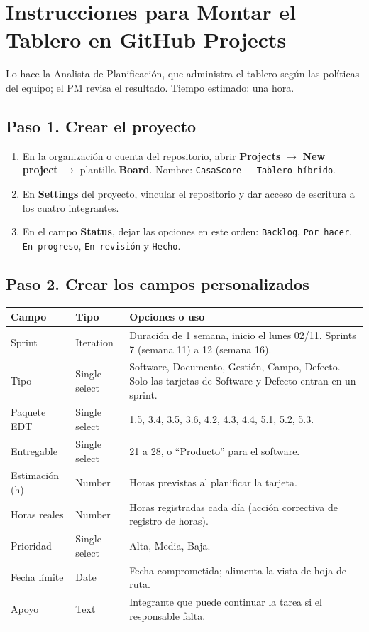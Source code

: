 \documentclass[11pt,a4paper]{article}
\begin{document}
\section{Instrucciones para Montar el Tablero en GitHub Projects}
Lo hace la Analista de Planificación, que administra el tablero según las políticas del equipo; el PM revisa el resultado. Tiempo estimado: una hora.

\subsection{Paso 1. Crear el proyecto}
\begin{enumerate}[leftmargin=*]
    \item En la organización o cuenta del repositorio, abrir \textbf{Projects} $\rightarrow$ \textbf{New project} $\rightarrow$ plantilla \textbf{Board}. Nombre: \texttt{CasaScore -- Tablero híbrido}.
    \item En \textbf{Settings} del proyecto, vincular el repositorio y dar acceso de escritura a los cuatro integrantes.
    \item En el campo \textbf{Status}, dejar las opciones en este orden: \texttt{Backlog}, \texttt{Por hacer}, \texttt{En progreso}, \texttt{En revisión} y \texttt{Hecho}.
\end{enumerate}

\subsection{Paso 2. Crear los campos personalizados}
{\small
{}
\noindent\begin{tabularx}{\textwidth}{@{}P{3.0cm} P{2.5cm} L@{}}
\toprule
{}
\textbf{Campo} & \textbf{Tipo} & \textbf{Opciones o uso} \\
\midrule
Sprint & Iteration & Duración de 1 semana, inicio el lunes 02/11. Sprints 7 (semana 11) a 12 (semana 16). \\
Tipo & Single select & Software, Documento, Gestión, Campo, Defecto. Solo las tarjetas de Software y Defecto entran en un sprint. \\
Paquete EDT & Single select & 1.5, 3.4, 3.5, 3.6, 4.2, 4.3, 4.4, 5.1, 5.2, 5.3. \\
Entregable & Single select & 21 a 28, o ``Producto'' para el software. \\
Estimación (h) & Number & Horas previstas al planificar la tarjeta. \\
Horas reales & Number & Horas registradas cada día (acción correctiva de registro de horas). \\
Prioridad & Single select & Alta, Media, Baja. \\
Fecha límite & Date & Fecha comprometida; alimenta la vista de hoja de ruta. \\
Apoyo & Text & Integrante que puede continuar la tarea si el responsable falta. \\
\bottomrule
\end{tabularx}
}
\end{document}
